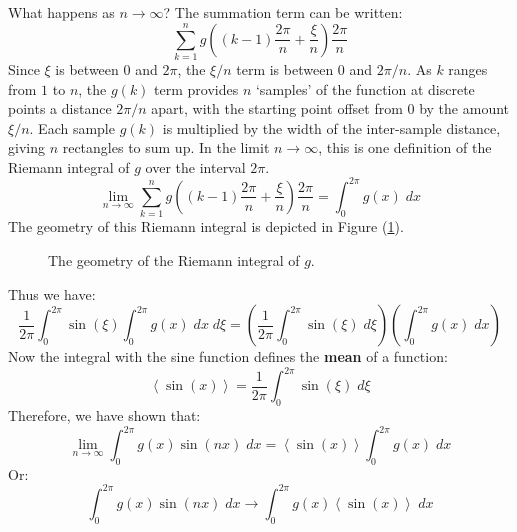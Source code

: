 \documentclass[12pt, a4paper, twoside, openright]{book}
\begin{document}
What happens as $n \to \infty$?  The summation term can be written:
\begin{equation}
\sum_{k=1}^n g\left((k-1)\frac{ 2\pi}{n} + \frac{\xi}{n} \right) \frac{2\pi}{n}
 \end{equation}
Since $\xi$ is between $0$ and $2\pi$, the $\xi/n$ term is between $0$ and $2\pi/n$.
As $k$ ranges from $1$ to $n$, the $g(k)$ term provides $n$ `samples' of the function at discrete points a distance $2\pi/n$ apart, with the starting point offset from $0$ by the amount $\xi/n$.  Each sample $g(k)$ is multiplied by the width of the inter-sample distance, giving $n$ rectangles to sum up.   In the limit $n \to \infty$, this is one definition of the Riemann integral of $g$ over the interval $2\pi$.
\begin{equation}
\lim_{n \to \infty} \sum_{k=1}^n g\left((k-1)\frac{ 2\pi}{n} + \frac{\xi}{n} \right) \frac{2\pi}{n} = \int_0^{2\pi} g(x) \;dx
 \end{equation}
The geometry of this Riemann integral is depicted in Figure (\ref{riemann}).
\begin{figure}[ht]
\centering
{}
\caption{The geometry of the Riemann integral of $g$.}\label{riemann}
\end{figure}


Thus we have:
\begin{equation}
\frac{1}{2\pi} \int_0^{2\pi} \sin(\xi)
\int_0^{2\pi} g(x) \;dx \;d\xi
= 
\left( \frac{1}{2\pi} \int_0^{2\pi} \sin(\xi) \;d\xi \right)
\left( \int_0^{2\pi} g(x) \;dx \right)
 \end{equation}
Now the integral with the sine function defines the \textbf{mean} of a function:
\begin{equation}
\left< \sin(x) \right> = \frac{1}{2\pi} \int_0^{2\pi} \sin(\xi) \;d\xi
\end{equation}
Therefore, we have shown that:
\begin{equation}
\lim_{n \to \infty} \int_0^{2\pi} g(x) \sin(nx) \;dx = \left< \sin(x) \right>
 \int_0^{2\pi} g(x) \;dx
\end{equation}
Or:
\begin{equation}
\int_0^{2\pi} g(x) \sin(nx) \;dx  \to  
 \int_0^{2\pi} g(x) \left< \sin(x) \right> \;dx
\end{equation}
\end{document}
